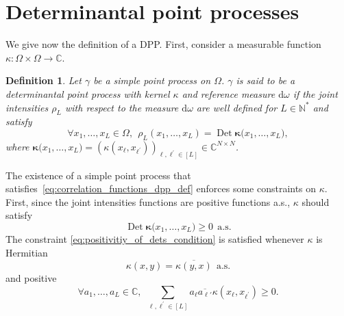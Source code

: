 \documentclass[twoside,11pt]{book}
\newtheorem{definition}{Definition}
\numberwithin{theorem}{chapter}
\numberwithin{definition}{chapter}
\numberwithin{proposition}{chapter}
\numberwithin{corollary}{chapter}
\numberwithin{example}{chapter}
\numberwithin{lemma}{chapter}
\DeclareMathOperator{\Det}{Det}
\begin{document}








\section{Determinantal point processes}\label{sec:dpp_defs}

We give now the definition of a DPP. First, consider a measurable function $\kappa: \Omega \times \Omega \rightarrow \mathbb{C}$.
\begin{definition}
Let $\gamma$ be a simple point process on $\Omega$. $\gamma$ is said to be a determinantal point process with kernel $\kappa$ and reference measure $\mathrm{d}\omega$ if the joint intensities $\rho_L$ with respect to the measure $\mathrm{d}\omega$ are well defined for $L \in \mathbb{N}^{*}$ and satisfy
\begin{equation}\label{eq:correlation_functions_dpp_def}
\forall x_{1}, \dots, x_{L} \in \Omega, \:\: \rho_{L}(x_{1}, \dots, x_{L}) = \Det \bm{\kappa}\big( x_{1}, \dots, x_{L} \big),
\end{equation}
where $\bm{\kappa}\big( x_{1}, \dots, x_{L} \big) = (\kappa(x_{\ell},x_{\ell^{'}}))_{\ell,\ell^{'} \in [L]} \in \mathbb{C}^{N \times N}$.

\end{definition}

The existence of a simple point process that satisfies~\eqref{eq:correlation_functions_dpp_def} enforces some constraints on $\kappa$. First, since the joint intensities functions are positive functions a.s., $\kappa$ should satisfy 
\begin{equation}\label{eq:positivitiy_of_dets_condition}
\Det \bm{\kappa}\big(x_{1}, \dots, x_{L} \big) \geq 0 \:\: \text{a.s.} 
\end{equation}
The constraint \eqref{eq:positivitiy_of_dets_condition} is satisfied whenever $\kappa$ is Hermitian
\begin{equation} \label{eq:hermitian_condition_kappa}
\kappa(x,y) = \overline{\kappa(y,x)} \:\: \text{a.s.}  
\end{equation}
and positive
\begin{equation}\label{eq:positivity_condition_kappa}
\forall a_{1}, \dots, a_{L} \in \mathbb{C}, \:\: \sum\limits_{\ell,\ell^{'} \in [L]} a_{\ell}\overline{a_{\ell'}} \kappa(x_{\ell},x_{\ell^{'}}) \geq 0.
\end{equation} 
\end{document}
